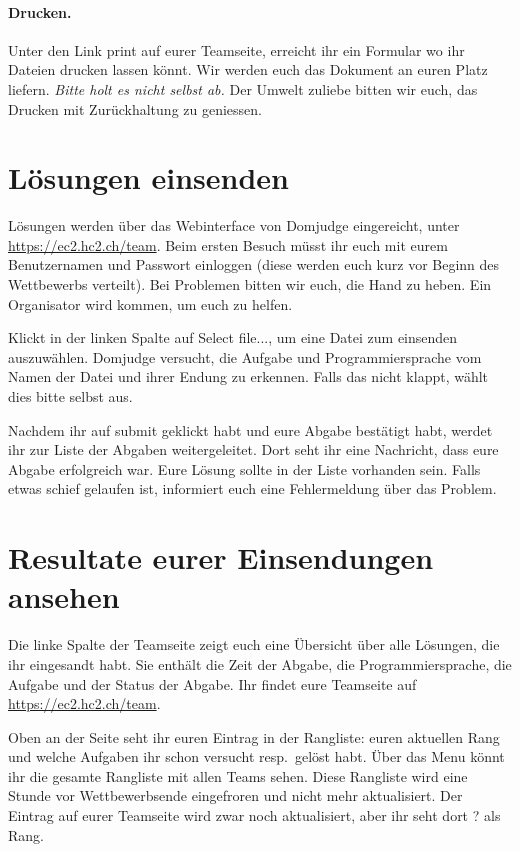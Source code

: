 \paragraph{Drucken.}
Unter den Link \glqq{} print \grqq{} auf eurer Teamseite,
erreicht ihr ein Formular wo ihr Dateien drucken lassen könnt.
Wir werden euch das Dokument an euren Platz liefern. \emph{Bitte holt es nicht
selbst ab.} Der Umwelt zuliebe bitten wir euch, das Drucken mit Zurückhaltung zu
geniessen.


\clearpage
\section{Lösungen einsenden}
\label{sec:submit}
Lösungen werden über das Webinterface von Domjudge eingereicht, unter
\url{https://ec2.hc2.ch/team}. Beim ersten Besuch müsst ihr euch mit eurem
Benutzernamen und Passwort einloggen (diese werden euch kurz vor Beginn des
Wettbewerbs verteilt). Bei Problemen bitten wir euch, die Hand zu heben. Ein
Organisator wird kommen, um euch zu helfen.

Klickt in der linken Spalte auf \glqq Select file...\grqq{}, um eine Datei zum
einsenden auszuwählen. Domjudge versucht, die Aufgabe und Programmiersprache vom
Namen der Datei und ihrer Endung zu erkennen. Falls das nicht klappt, wählt dies
bitte selbst aus.

Nachdem ihr auf \glqq submit\grqq{} geklickt habt und eure Abgabe bestätigt
habt, werdet ihr zur Liste der Abgaben weitergeleitet. Dort seht ihr eine
Nachricht, dass eure Abgabe erfolgreich war. Eure Lösung sollte in der Liste
vorhanden sein. Falls etwas schief gelaufen ist, informiert euch eine
Fehlermeldung über das Problem.

\section{Resultate eurer Einsendungen ansehen}
Die linke Spalte der Teamseite zeigt euch eine Übersicht über alle Lösungen, die
ihr eingesandt habt. Sie enthält die Zeit der Abgabe, die Programmiersprache,
die Aufgabe und der Status der Abgabe. Ihr findet eure Teamseite auf
\url{https://ec2.hc2.ch/team}.

Oben an der Seite seht ihr euren Eintrag in der Rangliste: euren aktuellen Rang
und welche Aufgaben ihr schon versucht resp.\ gelöst habt. Über das Menu könnt
ihr die gesamte Rangliste mit allen Teams sehen. Diese Rangliste wird eine
Stunde vor Wettbewerbsende \glqq eingefroren\grqq{} und nicht mehr aktualisiert.
Der Eintrag auf eurer Teamseite wird zwar noch aktualisiert, aber ihr seht dort
\glqq ?\grqq{} als Rang.

